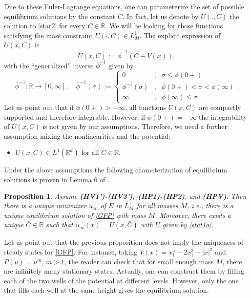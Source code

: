 \documentclass[reqno]{amsart}
\newtheorem{prop}[lemma]{Proposition}
\newcommand{\R}{\mathbb{R}}
\newcommand{\uinf}{u_\infty}
\begin{document}
Due to these Euler-Lagrange equations, one can parameterize the set of possible equilibrium solutions by the constant $C$. In fact, let us denote by $U(.,C)$ the solution to \eqref{stat2} for every $C\in\R$. We will be looking for those functions satisfying the mass constraint $U(\cdot,C)\in L^1_M$. The explicit expression of $U(x,C)$ is
\begin{equation}
U(x,C):=\overline{\phi}^{-1}(C - V(x)),
\label{stat1a} \end{equation}
with the ``generalized'' inverse $\overline{\phi}^{-1}$ given by
\begin{equation}\label{phi-inv}
\overline{\phi}^{-1}  :  \R  \to [0,\infty],\quad \overline{\phi}^{-1}(\sigma) :=
 \left\{ \begin{array}{rcl}
0 & , & \sigma\le \phi(0+) \\[0.3cm]
\phi^{-1}(\sigma) & , & \phi(0+) <\sigma< \phi(\infty) \\[0.3cm]
\infty & , & \phi(\infty) \le \sigma \end{array} \right. .
\end{equation}
Let us point out that if $\phi(0+)>-\infty$, all functions $U(x,C)$ are compactly supported and therefore integrable. However, if $\phi(0+)=-\infty$ the integrability of $U(x,C)$ is not given by our assumptions. Therefore, we need a further assumption mixing the nonlinearities and 
the potential:
\begin{itemize}
\item[{\bf (HPV)}] $U(x,C)\in L^1(\R^d)$ for all $C\in\R$.
\end{itemize}

Under the above assumptions the following characterization of equilibrium solutions is proven in Lemma 6 of \cite{CJMTU}. 

\begin{prop}\label{charac} 
Assume {\bf (HV1')-(HV3'), (HP1)-(HP2)}, and {\bf (HPV)}. Then there is a unique minimizer $\uinf$ of $E$ in $L^1_M$ for all masses $M$, i.e., there is a unique equilibrium solution of \eqref{GFP} with mass $M$. Moreover, there exists a unique $\bar C\in \R$ such that $\uinf(x)=U(x,\bar C)$ with $U$ given by \eqref{stat1a}.
\end{prop}

Let us point out that the previous proposition does not imply the uniqueness of steady states for \eqref{GFP}. For instance, taking $V(x)=x_1^4-2x_1^2+|x|^2$ and $P(u)=u^m$, $m>1$, the reader can check that for small enough mass $M$, there are infinitely many stationary states. Actually, one can construct them by filling each of the two wells of the potential at different levels. However, only the one that fills each well at the same height gives the equilibrium solution.
\end{document}
